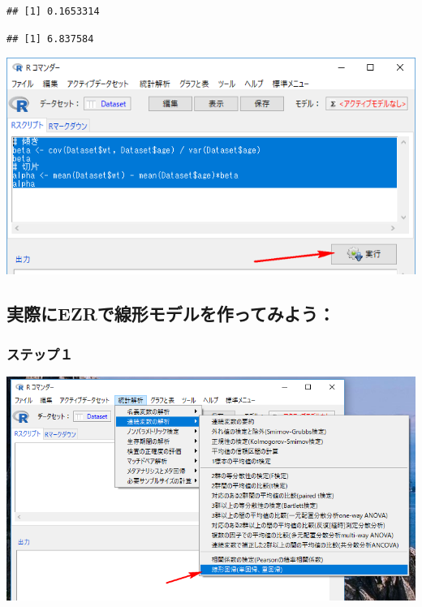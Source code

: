 \documentclass[11pt,]{problemset}
\newenvironment{Shaded}{\begin{snugshade}}{\end{snugshade}}
\newcommand{\CommentTok}[1]{\textcolor[rgb]{0.56,0.35,0.01}{\textit{#1}}}
\newcommand{\KeywordTok}[1]{\textcolor[rgb]{0.13,0.29,0.53}{\textbf{#1}}}
\newcommand{\NormalTok}[1]{#1}
\newcommand{\OperatorTok}[1]{\textcolor[rgb]{0.81,0.36,0.00}{\textbf{#1}}}
\newcommand{\StringTok}[1]{\textcolor[rgb]{0.31,0.60,0.02}{#1}}
\begin{document}
\begin{verbatim}
## [1] 0.1653314
\end{verbatim}

\begin{Shaded}
\end{Shaded}

\begin{verbatim}
## [1] 6.837584
\end{verbatim}

\begin{center}\includegraphics[width=0.75\linewidth]{pic/betaalpha} \end{center}

\hypertarget{ezr}{%
\subsection{実際にEZRで線形モデルを作ってみよう：}\label{ezr}}

\hypertarget{-5}{%
\subsubsection{ステップ１}\label{-5}}

\begin{center}\includegraphics[width=0.8\linewidth]{pic/lm00} \end{center}
\end{document}
